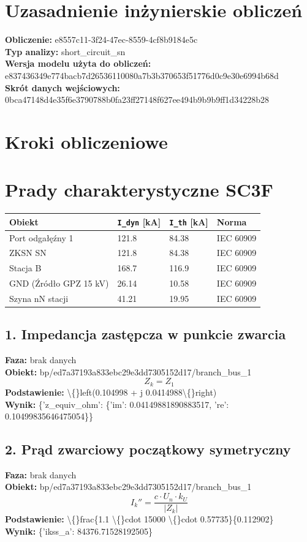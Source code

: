 ﻿\documentclass[11pt]{article}
\begin{document}
\section*{Uzasadnienie inżynierskie obliczeń}
\textbf{Obliczenie:} e8557c11-3f24-47ec-8559-4cf8b9184e5c\\
\textbf{Typ analizy:} short\_circuit\_sn\\
\textbf{Wersja modelu użyta do obliczeń:} e837436349e774bacb7d26536110080a7b3b370653f51776d0c9e30e6994b68d\\
\textbf{Skrót danych wejściowych:} 0bca47148d4e35f6e3790788b0fa23ff27148f627ee494b9b9b9ff1d34228b28\\
\section*{Kroki obliczeniowe}
\section*{Prady charakterystyczne SC3F}
\begin{longtable}{llll}
Obiekt & \verb|I_dyn| [kA] & \verb|I_th| [kA] & Norma \\
\hline
Port odgałęźny 1 & 121.8 & 84.38 & IEC 60909 \\
ZKSN SN & 121.8 & 84.38 & IEC 60909 \\
Stacja B & 168.7 & 116.9 & IEC 60909 \\
GND (Źródło GPZ 15 kV) & 26.14 & 10.58 & IEC 60909 \\
Szyna nN stacji & 41.21 & 19.95 & IEC 60909 \\
\end{longtable}
\subsection*{1. Impedancja zastępcza w punkcie zwarcia}
\textbf{Faza:} brak danych\\
\textbf{Obiekt:} bp/ed7a37193a833ebc29e3dd7305152d17/branch\_bus\_1\\
\[
Z_k = Z_1
\]
\textbf{Podstawienie:} \textbackslash\{\}left(0.104998 + j 0.0414988\textbackslash\{\}right)\\
\textbf{Wynik:} \{'z\_equiv\_ohm': \{'im': 0.04149881890883517, 're': 0.10499835646475054\}\}\\
\subsection*{2. Prąd zwarciowy początkowy symetryczny}
\textbf{Faza:} brak danych\\
\textbf{Obiekt:} bp/ed7a37193a833ebc29e3dd7305152d17/branch\_bus\_1\\
\[
I_{k}'' = \frac{c \cdot U_n \cdot k_U}{\left|Z_k\right|}
\]
\textbf{Podstawienie:} \textbackslash\{\}frac\{1.1 \textbackslash\{\}cdot 15000 \textbackslash\{\}cdot 0.57735\}\{0.112902\}\\
\textbf{Wynik:} \{'ikss\_a': 84376.71528192505\}\\
\end{document}
